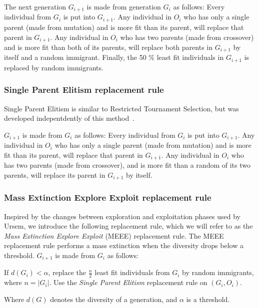 The next generation $G_{i+1}$ is made from generation $G_i$ as follows:
Every individual from $G_i$ is put into $G_{i+1}$.
Any individual in $O_i$ who has only a single parent (made from mutation) and is more fit than its parent, will replace that parent in $G_{i+1}$.
Any individual in $O_i$ who has two parents (made from crossover) and is more fit than both of its parents, will replace both parents in $G_{i+1}$ by itself and a random immigrant.
Finally, the 50 \% least fit individuals in $G_{i+1}$ is replaced by random immigrants.


\subsubsection{Single Parent Elitism replacement rule}
Single Parent Elitism is similar to Restricted Tournament Selection, but was developed indepentdently of this method~\cite[p. 132]{Luke2013Metaheuristics}.

$G_{i+1}$ is made from $G_i$ as follows:
Every individual from $G_i$ is put into $G_{i+1}$.
Any individual in $O_i$ who has only a single parent (made from mutation) and is more fit than its parent, will replace that parent in $G_{i+1}$.
Any individual in $O_i$ who has two parents (made from crossover), and is more fit than a random of its two parents, will replace its parent in $G_{i+1}$ by itself.

\subsubsection{Mass Extinction Explore Exploit replacement rule}
Inspired by the changes between exploration and exploitation phases used by Ursem\cite{ursem2002diversity}, we introduce the following replacement rule, which we will refer to as the \emph{Mass Extinction Explore Exploit} (MEEE) replacement rule.
The MEEE replacement rule performs a mass extinction when the diversity drops below a threshold.
$G_{i+1}$ is made from $G_i$ as follows:

If $d(G_i) < \alpha$, replace the $\frac{n}{2}$ least fit individuals from $G_i$ by random immigrants, where $n = \lvert G_i \rvert$.
Use the \emph{Single Parent Elitism} replacement rule on $(G_i, O_i)$.

Where $d(G)$ denotes the diversity of a generation, and $\alpha$ is a threshold. 


